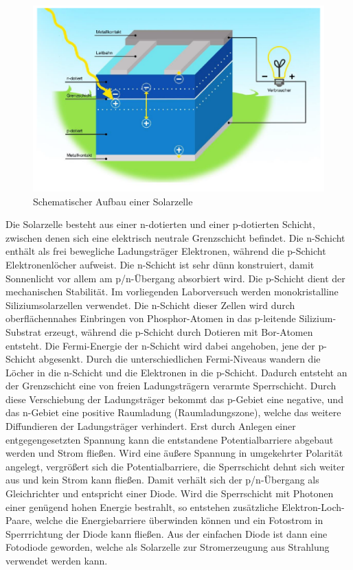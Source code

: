 \documentclass[english, ngerman]{scrartcl}
\begin{document}
\begin{figure}[H]
    \centering
    \begin{samepage}
        \includegraphics[width=0.7\linewidth]{fig/solarzelle_grundlagen.png}
        \caption{Schematischer Aufbau einer Solarzelle}
        \label{fig:solarzelle_schema}
    \end{samepage}
\end{figure}
%
Die Solarzelle besteht aus einer n-dotierten und einer p-dotierten Schicht, zwischen denen sich eine elektrisch neutrale Grenzschicht befindet. Die n-Schicht enthält als frei bewegliche Ladungsträger Elektronen, während die p-Schicht Elektronenlöcher aufweist. Die n-Schicht ist sehr dünn konstruiert, damit Sonnenlicht vor allem am p/n-Übergang absorbiert wird. Die p-Schicht dient der mechanischen Stabilität. Im vorliegenden Laborversuch werden monokristalline Siliziumsolarzellen verwendet. Die n-Schicht dieser Zellen wird durch oberflächennahes Einbringen von Phosphor-Atomen in das p-leitende Silizium-Substrat erzeugt, während die p-Schicht durch Dotieren mit Bor-Atomen entsteht. Die Fermi-Energie der n-Schicht wird dabei angehoben, jene der p-Schicht abgesenkt. Durch die unterschiedlichen Fermi-Niveaus wandern die Löcher in die n-Schicht und die Elektronen in die p-Schicht. Dadurch entsteht an der Grenzschicht eine von freien Ladungsträgern verarmte Sperrschicht. Durch diese Verschiebung der Ladungsträger bekommt das p-Gebiet eine negative, und das n-Gebiet eine positive Raumladung (Raumladungszone), welche das weitere Diffundieren der Ladungsträger verhindert. Erst durch Anlegen einer entgegengesetzten Spannung kann die entstandene Potentialbarriere abgebaut werden und Strom fließen. Wird eine äußere Spannung in umgekehrter Polarität angelegt, vergrößert sich die Potentialbarriere, die Sperrschicht dehnt sich weiter aus und kein Strom kann fließen. Damit verhält sich der p/n-Übergang als Gleichrichter und entspricht einer Diode. Wird die Sperrschicht mit Photonen einer genügend hohen Energie bestrahlt, so entstehen zusätzliche Elektron-Loch-Paare, welche die Energiebarriere überwinden können und ein Fotostrom in Sperrrichtung der Diode kann fließen. Aus der einfachen Diode ist dann eine Fotodiode geworden, welche als Solarzelle zur Stromerzeugung aus Strahlung verwendet werden kann.
\end{document}
